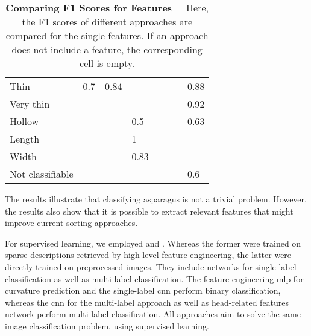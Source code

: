 \begin{table}[!htb]
{\begin{tabular}{llllllll}
Thin             & 0.7  & 0.84                                            &                          &                          &                          &                          & 0.88                                 \\
Very thin        &      &                                                 &                          &                          &                          &                          & 0.92                                 \\
Hollow           &                          &                             & 0.5  &                          &                          &                          & 0.63                                 \\
Length           &                          &                             & 1    &                          &                          &                          &                  \\
Width            &                          &                             & 0.83 &                          &                          &                          &                  \\
Not classifiable &                          &                             &                          &                          &                          &                          & 0.6                                 
\end{tabular}%
}
\caption[Comparing F1 Scores for Features]{\textbf{Comparing F1 Scores for Features}~~~Here, the F1 scores of different approaches are compared for the single features. If an approach does not include a feature, the corresponding cell is empty.}
	\label{tab:f1ScoresLarge}
\end{table}

The results illustrate that classifying asparagus is not a trivial problem. However, the results also show that it is possible to extract relevant features that might improve current sorting approaches.

\bigskip
For supervised learning, we employed  and  . Whereas the former were trained on sparse descriptions retrieved by high level feature engineering, the latter were directly trained on preprocessed images. They include networks for single-label classification as well as multi-label classification.
The feature engineering \acrshort{mlp} for curvature prediction and the single-label  \acrshort{cnn} perform binary classification, whereas the  \acrshort{cnn} for the multi-label approach as well as head-related features network perform multi-label classification. All approaches aim to solve the same image classification problem, using supervised learning.

